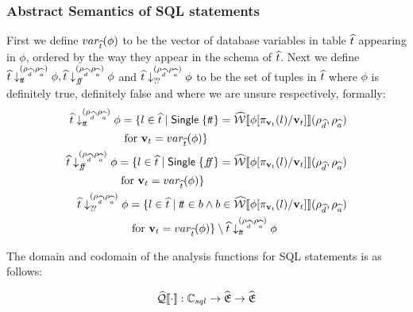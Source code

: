 \subsubsection{Abstract Semantics of SQL statements}

First we define $var_{\widehat{t}}(\phi)$ to be the vector of database variables in table $\widehat{t}$ appearing in $\phi$, ordered by the way they appear in the schema of $\widehat{t}$.
Next we define $\widehat{t} \downarrow_{t\!t}^{(\rho_{\widehat{d}}, \rho_{\widehat{a}})} \phi, \widehat{t} \downarrow_{f\!\!f}^{(\rho_{\widehat{d}}, \rho_{\widehat{a}})} \phi$ and  $\widehat{t} \downarrow_{?\!?}^{(\rho_{\widehat{d}}, \rho_{\widehat{a}})} \phi$ to be the set of tuples in $\widehat{t}$ where $\phi$ is definitely true, definitely false and where we are unsure respectively, formally:
\begin{align}
    \begin{split}
        \abstable \downarrow_{\true}^{(\rho_{\ab{d}}, \rho_{\ab{a}})} \phi &= \{ l \in \ab{t} \mid \mathsf{Single} \; \{ \true \} = \abspredsem{\phi[\pi_{\mathbf{v}_t}(l)/\mathbf{v}_t]}(\rho_{\ab{d}}, \rho_{\ab{a}}) \\
        &\text{ for } \mathbf{v}_t = var_{\ab{t}}(\phi) \}
    \end{split}\\
    \begin{split}
        \abstable \downarrow_{\false}^{(\rho_{\ab{d}}, \rho_{\ab{a}})} \phi &= \{ l \in \ab{t} \mid \mathsf{Single} \; \{ \false \} = \abspredsem{\phi[\pi_{\mathbf{v}_t}(l)/\mathbf{v}_t]}(\rho_{\ab{d}}, \rho_{\ab{a}}) \\
        &\text{ for } \mathbf{v}_t = var_{\ab{t}}(\phi) \}
    \end{split}\\
    \begin{split}
        \abstable \downarrow_{\unknown}^{(\rho_{\ab{d}}, \rho_{\ab{a}})} \phi &= \{ l \in \ab{t} \mid \true \in b \land b \in \abspredsem{\phi[\pi_{\mathbf{v}_t}(l)/\mathbf{v}_t]}(\rho_{\ab{d}}, \rho_{\ab{a}}) \\
        &\text{ for } \mathbf{v}_t = var_{\ab{t}}(\phi) \} \setminus \abstable \downarrow_{\true}^{(\rho_{\ab{d}}, \rho_{\ab{a}})} \phi
    \end{split}
\end{align}

The domain and codomain of the analysis functions for SQL statements is as follows:

\begin{equation}
    \widehat{\mathcal{Q}}\llbracket \cdot \rrbracket : \mathbb{C}_{sql} \rightarrow \widehat{\mathfrak{E}} \rightarrow \widehat{\mathfrak{E}}
\end{equation}


